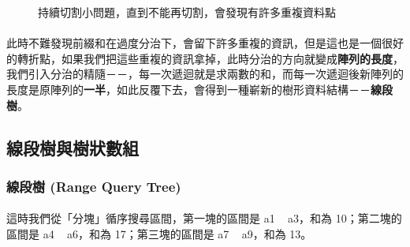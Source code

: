 \documentclass[12pt,a4paper,oneside]{report}
\begin{document}
\begin{CJK}{UTF8}{bkai}
\begin{figure}[h]
\centering
{}
\caption{持續切割小問題，直到不能再切割，會發現有許多重複資料點}
\label{tree:fig:rsq:dnc3}
\end{figure}

\paragraph{}此時不難發現前綴和在過度分治下，會留下許多重複的資訊，但是這也是一個很好的轉折點，如果我們把這些重複的資訊拿掉，此時分治的方向就變成\textbf{陣列的長度}，我們引入分治的精隨－－，每一次遞迴就是求兩數的和，而每一次遞迴後新陣列的長度是原陣列的\textbf{一半}，如此反覆下去，會得到一種嶄新的樹形資料結構－－\textbf{線段樹}。



\subsection{線段樹與樹狀數組}

\subsubsection{線段樹 (Range Query Tree)}

\paragraph{}這時我們從「分塊」循序搜尋區間，第一塊的區間是 a1 ~ a3，和為 10；第二塊的區間是 a4 ~ a6，和為 17；第三塊的區間是 a7 ~ a9，和為 13。


\end{CJK}
\end{document}
